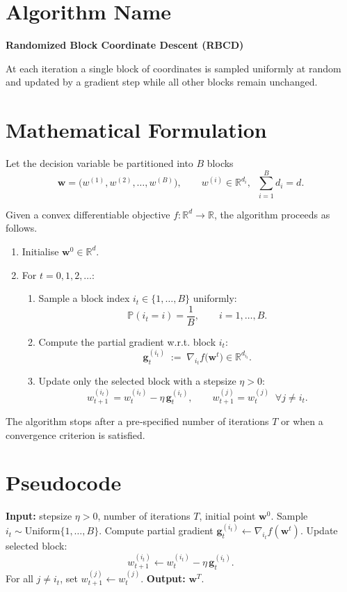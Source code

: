\documentclass{article}
\newcommand{\R}{\mathbb{R}}
\begin{document}
\section*{Algorithm Name}
\textbf{Randomized Block Coordinate Descent (RBCD)}  

At each iteration a single block of coordinates is sampled uniformly at random and updated by a gradient step while all other blocks remain unchanged.

\vspace{0.5em}
\section*{Mathematical Formulation}
Let the decision variable be partitioned into $B$ blocks
\[
\bm w = \big(w^{(1)},w^{(2)},\dots ,w^{(B)}\big),\qquad 
w^{(i)}\in\R^{d_i},\;\;\sum_{i=1}^{B}d_i = d .
\]

Given a convex differentiable objective $f:\R^{d}\to\R$, the algorithm proceeds as follows.
\begin{enumerate}
    \item Initialise $\bm w^{0}\in\R^{d}$.
    \item For $t=0,1,2,\dots$:
    \begin{enumerate}
        \item Sample a block index $i_t\in\{1,\dots ,B\}$ uniformly:
        \[
        \mathbb{P}(i_t=i)=\frac{1}{B},\qquad i=1,\dots ,B .
        \]
        \item Compute the partial gradient w.r.t. block $i_t$:
        \[
        \bm g^{(i_t)}_t \;:=\; \nabla_{i_t} f\!\big(\bm w^{t}\big)
        \in \R^{d_{i_t}} .
        \]
        \item Update only the selected block with a stepsize $\eta>0$:
        \[
        w^{(i_t)}_{t+1}= w^{(i_t)}_{t} - \eta\,\bm g^{(i_t)}_t,
        \qquad
        w^{(j)}_{t+1}= w^{(j)}_{t}\;\;\forall j\neq i_t .
        \]
    \end{enumerate}
\end{enumerate}
The algorithm stops after a pre‑specified number of iterations $T$ or when a
convergence criterion is satisfied.

\vspace{0.5em}
\section*{Pseudocode}
\begin{algorithm}[H]
\caption{Randomized Block Coordinate Descent}
\begin{algorithmic}[1]
\STATE \textbf{Input:} stepsize $\eta>0$, number of iterations $T$, initial point $\bm w^{0}$.
    \STATE Sample $i_t\sim \text{Uniform}\{1,\dots ,B\}$.
    \STATE Compute partial gradient $\bm g^{(i_t)}_t \gets \nabla_{i_t}f(\bm w^{t})$.
    \STATE Update selected block:
    \[
    w^{(i_t)}_{t+1}\gets w^{(i_t)}_{t}-\eta\,\bm g^{(i_t)}_t .
    \]
    \STATE For all $j\neq i_t$, set $w^{(j)}_{t+1}\gets w^{(j)}_{t}$.
\ENDFOR
\STATE \textbf{Output:} $\bm w^{T}$.
\end{algorithmic}
\end{algorithm}
\end{document}
